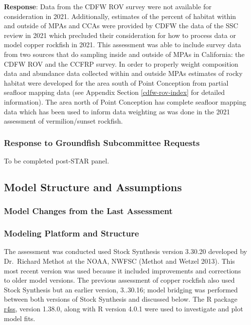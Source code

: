 \documentclass[11pt,
  english,
  letterpaper,
]{article}
\begin{document}
\textbf{Response}: Data from the CDFW ROV survey were not available for consideration in 2021. Additionally, estimates of the percent of habitat within and outside of MPAs and CCAs were provided by CDFW the data of the SSC review in 2021 which precluded their consideration for how to process data or model copper rockfish in 2021. This assessment was able to include survey data from two sources that do sampling inside and outside of MPAs in California: the CDFW ROV and the CCFRP survey. In order to properly weight composition data and abundance data collected within and outside MPAs estimates of rocky habitat were developed for the area south of Point Conception from partial seafloor mapping data (see Appendix Section \ref{cdfw-rov-index} for detailed information). The area north of Point Conception has complete seafloor mapping data which has been used to inform data weighting as was done in the 2021 assessment of vermilion/sunset rockfish.

\hypertarget{response-to-groundfish-subcommittee-requests}{%
\subsubsection{Response to Groundfish Subcommittee Requests}\label{response-to-groundfish-subcommittee-requests}}

To be completed post-STAR panel.

\hypertarget{model-structure-and-assumptions}{%
\subsection{Model Structure and Assumptions}\label{model-structure-and-assumptions}}

\hypertarget{model-changes-from-the-last-assessment}{%
\subsubsection{Model Changes from the Last Assessment}\label{model-changes-from-the-last-assessment}}

\hypertarget{modeling-platform-and-structure}{%
\subsubsection{Modeling Platform and Structure}\label{modeling-platform-and-structure}}

The assessment was conducted used Stock Synthesis version 3.30.20 developed by Dr.~Richard Methot at the NOAA, NWFSC (Methot and Wetzel 2013). This most recent version was used because it included improvements and corrections to older model versions. The previous assessment of copper rockfish also used Stock Synthesis but an earlier version, 3..30.16; model bridging was performed between both versions of Stock Synthesis and discussed below. The R package \href{https://github.com/r4ss/r4ss}{r4ss}, version 1.38.0, along with R version 4.0.1 were used to investigate and plot model fits.
\end{document}
